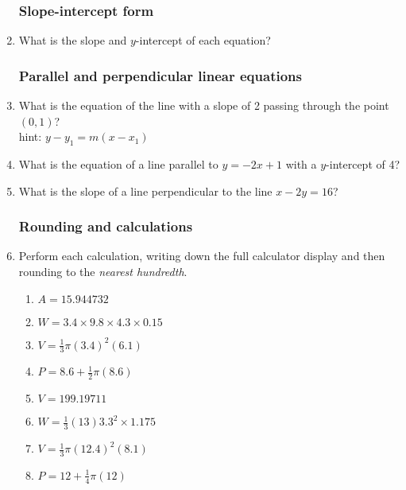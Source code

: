 \documentclass[12pt, twoside]{article}
\begin{document}
\begin{enumerate}
  \subsubsection*{Slope-intercept form}
  \item What is the slope and $y$-intercept of each equation?
\begin{enumerate}[itemsep=2cm]
    \end{enumerate} \vspace{1.5cm}

\newpage
\subsubsection*{Parallel and perpendicular linear equations}

  \item What is the equation of the line with a slope of 2 passing through the point $(0,1)$? \\
  hint: $y-y_1=m(x-x_1)$ \vspace{1.5cm}
  \item What is the equation of a line parallel to $y=-2x+1$ with a $y$-intercept of 4? \vspace{1.5cm}
  \item What is the slope of a line perpendicular to the line $x-2y=16$? \vspace{3cm}

\subsubsection*{Rounding and calculations}
  \item Perform each calculation, writing down the full calculator display and then rounding to the \emph{nearest hundredth}.
    \begin{multicols}{2}
    \begin{enumerate}[itemsep=2cm]
      \item $A=15.944732$
      \item $W=3.4 \times 9.8 \times 4.3 \times 0.15$
            
      \item $V=\frac{1}{3} \pi (3.4)^2(6.1)$
      \item $P=8.6 + \frac{1}{2} \pi (8.6)$  
      \item $V=199.19711$
      \item $W=\frac{1}{3} (13)  3.3^2 \times 1.175$
      \item $V=\frac{1}{3} \pi (12.4)^2(8.1)$
      \item $P=12 + \frac{1}{4} \pi (12)$ 
    \end{enumerate}
    \end{multicols}\vspace{2cm}
  

\end{enumerate}
\end{document}
